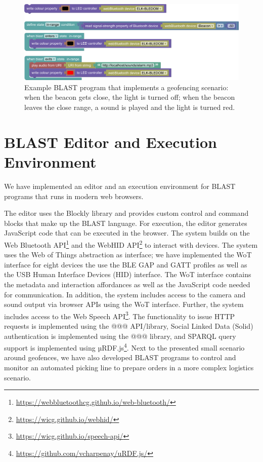 \documentclass[runningheads]{llncs}
\begin{document}
\begin{figure}
\includegraphics[width=\textwidth]{screenshot 3.png}%
\caption{Example BLAST program that implements a geofencing scenario: when the beacon gets close, the light is turned off; when the beacon leaves the close range, a sound is played and the light is turned red.} \label{fig1}
\end{figure}

\section{BLAST Editor and Execution Environment}

We have implemented an editor and an execution environment for BLAST programs that runs in modern web browsers.

The editor uses the Blockly library and provides custom control and command blocks that make up the BLAST language.
For execution, the editor generates JavaScript code that can be executed in the browser.
The system builds on the Web Bluetooth API\footnote{\url{https://webbluetoothcg.github.io/web-bluetooth/}} and the WebHID API\footnote{\url{https://wicg.github.io/webhid/}} to interact with devices.
The system uses the Web of Things abstraction as interface; we have implemented the WoT interface for eight devices the use the BLE GAP and GATT profiles as well as the USB Human Interface Devices (HID) interface.
The WoT interface contains the metadata and interaction affordances as well as the JavaScript code needed for communication.
In addition, the system includes access to the camera and sound output via browser APIs using the WoT interface.
Further, the system includes access to the Web Speech API\footnote{\url{https://wicg.github.io/speech-api/}}.
The functionality to issue HTTP requests is implemented using the @@@ API/library, Social Linked Data (Solid) authentication is implemented using the @@@ library, and SPARQL query support is implemented using µRDF.js\footnote{\url{https://github.com/vcharpenay/uRDF.js/}}.
Next to the presented small scenario around geofences, we have also developed BLAST programs to control and monitor an automated picking line to prepare orders in a more complex logistics scenario.
\end{document}

